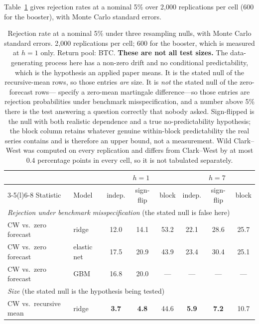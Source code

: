 \documentclass{article}
\theoremstyle{plain}
\theoremstyle{definition}
\begin{document}
Table~\ref{tab:size} gives rejection rates at a nominal 5\% over 2{,}000
replications per cell (600 for the booster), with Monte Carlo standard errors.

\begin{table}[t]
  \centering
  \caption{Rejection rate at a nominal 5\% under three resampling nulls, with Monte
  Carlo standard errors. 2{,}000 replications per cell; 600 for the booster, which
  is measured at $h=1$ only. Return pool: BTC. \textbf{These are not all test sizes.}
  The data-generating process here has a non-zero drift and no conditional predictability,
  which is the hypothesis an applied paper means. It is the stated null of the
  recursive-mean rows, so those entries \emph{are} size. It is \emph{not} the stated null of
  the zero-forecast rows---\citet{clark2006} specify a zero-mean martingale difference---so
  those entries are rejection probabilities under benchmark misspecification, and a number
  above 5\% there is the test answering a question correctly that nobody asked. Sign-flipped
  is the null with both realistic dependence and a true no-predictability hypothesis; the
  block column retains whatever genuine within-block predictability the real series contains
  and is therefore an upper bound, not a measurement. Wild Clark--West was computed on every
  replication and differs from Clark--West by at most $0.4$ percentage points in every cell,
  so it is not tabulated separately.}
  \label{tab:size}
  \small
  \setlength{\tabcolsep}{4pt}
  \begin{tabular}{llccc@{\qquad}ccc}
    \toprule
    & & \multicolumn{3}{c}{$h = 1$} & \multicolumn{3}{c}{$h = 7$} \\
    \cmidrule(lr){3-5}\cmidrule(l){6-8}
    Statistic & Model & indep. & sign-flip & block & indep. & sign-flip & block \\
    \midrule
    \multicolumn{8}{l}{\emph{Rejection under benchmark misspecification} (the stated null is false here)} \\
    CW vs.\ zero forecast  & ridge       & 12.0 & 14.1 & 53.2 & 22.1 & 28.6 & 25.7 \\
    CW vs.\ zero forecast  & elastic net & 17.5 & 20.9 & 43.9 & 23.4 & 30.4 & 25.1 \\
    CW vs.\ zero forecast  & GBM         & 16.8 & 20.0 & ---  & ---  & ---  & ---  \\
    \midrule
    \multicolumn{8}{l}{\emph{Size} (the stated null is the hypothesis being tested)} \\
    CW vs.\ recursive mean & ridge       & \textbf{3.7} & \textbf{4.8} & 44.6 & \textbf{5.9} & \textbf{7.2} & 10.7 \\

\end{tabular}
\end{table}
\end{document}
